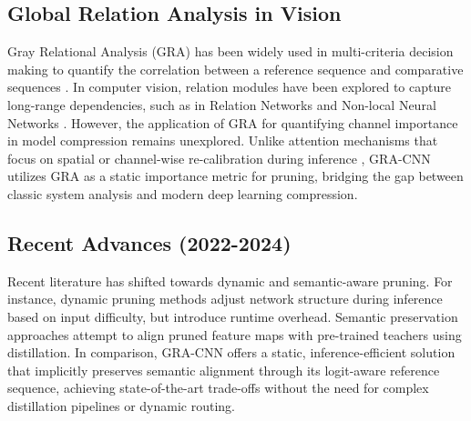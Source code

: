 \subsection{Global Relation Analysis in Vision}
Gray Relational Analysis (GRA) has been widely used in multi-criteria decision making to quantify the correlation between a reference sequence and comparative sequences \citep{deng1982control}. In computer vision, relation modules have been explored to capture long-range dependencies, such as in Relation Networks \citep{hu2018squeeze} and Non-local Neural Networks \citep{wang2018non}. However, the application of GRA for quantifying channel importance in model compression remains unexplored. Unlike attention mechanisms that focus on spatial or channel-wise re-calibration during inference \citep{hu2018squeeze}, GRA-CNN utilizes GRA as a static importance metric for pruning, bridging the gap between classic system analysis and modern deep learning compression.

\subsection{Recent Advances (2022-2024)}
Recent literature has shifted towards dynamic and semantic-aware pruning. For instance, dynamic pruning methods \citep{lin2023dynamic} adjust network structure during inference based on input difficulty, but introduce runtime overhead. Semantic preservation approaches \citep{wang2023semantic} attempt to align pruned feature maps with pre-trained teachers using distillation. In comparison, GRA-CNN offers a static, inference-efficient solution that implicitly preserves semantic alignment through its logit-aware reference sequence, achieving state-of-the-art trade-offs without the need for complex distillation pipelines or dynamic routing.
